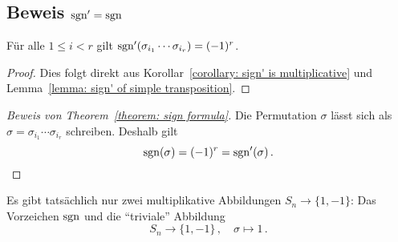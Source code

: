\subsection*{Beweis $\operatorname{sgn}' = \operatorname{sgn}$}

\begin{corollary}
  Für alle $1 \leq i < r$ gilt $\operatorname{sgn}'(\sigma_{i_1} \dotsm \sigma_{i_r}) = (-1)^r$.
\end{corollary}

\begin{proof}
  Dies folgt direkt aus Korollar~\ref{corollary: sign' is multiplicative} und Lemma~\ref{lemma: sign' of simple transposition}.
\end{proof}

\begin{proof}[Beweis von Theorem~\ref{theorem: sign formula}]
  Die Permutation $\sigma$ lässt sich als $\sigma = \sigma_{i_1} \dotsm \sigma_{i_r}$ schreiben.
  Deshalb gilt
  \[
      \operatorname{sgn}(\sigma)
    = (-1)^r
    = \operatorname{sgn}'(\sigma) \,.
    \qedhere
  \]
\end{proof}

\begin{remark}
  Es gibt tatsächlich nur zwei multiplikative Abbildungen $S_n \to \{1, -1\}$:
  Das Vorzeichen $\operatorname{sgn}$ und die \enquote{triviale} Abbildung
  \[
            S_n
    \to     \{1, -1\} \,,
    \quad   \sigma
    \mapsto 1 \,.
  \]

\end{remark}











